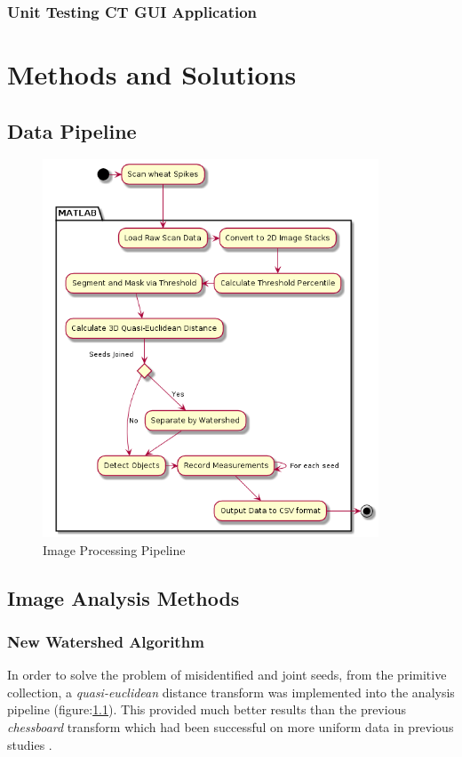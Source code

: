 \documentclass[11pt]{report}
\begin{document}
\subsection{Unit Testing CT GUI Application}
\label{sec-2-9-3}
\chapter{Methods and Solutions}
\label{sec-3}
\section{Data Pipeline}
\label{sec-3-1}

\begin{center}
\begin{figure}[htb]
\centering
\includegraphics[width=10cm]{./images/matlab.png}
\caption{\label{fig:matlab}Image Processing Pipeline}
\end{figure}
\end{center}

\section{Image Analysis Methods}
\label{sec-3-2}
\subsection{New Watershed Algorithm}
\label{sec-3-2-1}

In order to solve the problem of misidentified and joint seeds, from the primitive collection,
a  \emph{quasi-euclidean} distance transform was implemented into the analysis pipeline (figure:\ref{fig:matlab}). This provided much better results than the previous
\emph{chessboard} transform which had been successful on more uniform data in previous studies \cite{Hughes2017}.
\end{document}

